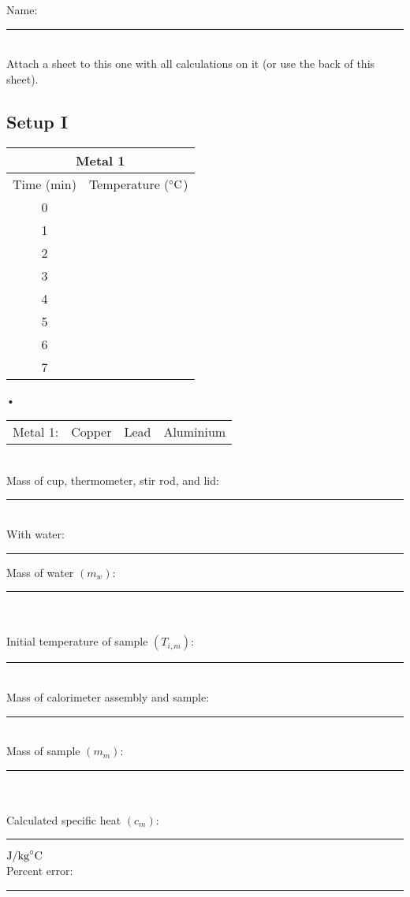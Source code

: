 \documentclass[main.tex]{subfiles}
\begin{document}
\begin{onehalfspace}
Name:\rule[-1mm]{4cm}{.1pt}\\
Attach a sheet to this one with all calculations on it (or use the back of this sheet).
\subsection*{Setup I}
\begin{wraptable}{r}{0.25\textwidth}
\begin{tabular}{|c|c|}
\hline
\multicolumn{2}{|c|}{Metal 1}\\
\hline
Time (min) & Temperature ($\celsius$)\\
\hline
0 & \\
\hline
1 & \\
\hline
2 & \\
\hline
3 & \\
\hline
4 & \\
\hline
5 & \\
\hline
6 & \\
\hline
7 & \\
\hline
\end{tabular}•
\end{wraptable}
\begin{tabular}{cccc}
Metal 1: & Copper & Lead & Aluminium
\end{tabular}\\
Mass of cup, thermometer, stir rod, and lid:\rule[-1mm]{2cm}{.1pt}\\
With water:\rule[-1mm]{2cm}{.1pt} Mass of water $(m_w)$:\rule[-1mm]{1.7cm}{.1pt}\\ \\
Initial temperature of sample $(T_{i,m})$:\rule[-1mm]{2cm}{.1pt}\\
Mass of calorimeter assembly and sample:\rule[-1mm]{2cm}{.1pt}\\
Mass of sample $(m_m)$:\rule[-1mm]{2cm}{.1pt}\\ \\
Calculated specific heat $(c_m)$:\rule[-1mm]{2cm}{.1pt} $\text{J}/\text{kg}\celsius$\\
Percent error:\rule[-1mm]{2cm}{.1pt}\\


\end{onehalfspace}
\end{document}
